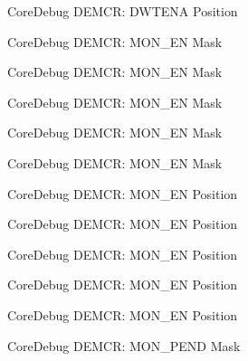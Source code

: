 \begin{DoxyRefList}
\label{deprecated__deprecated000272}%
%
Core\+Debug D\+E\+M\+CR\+: D\+W\+T\+E\+NA Position  
\item[Member \mbox{\hyperlink{group__CMSIS__CoreDebug_gac2b46b9b65bf8d23027f255fc9641977}{Core\+Debug\+\_\+\+D\+E\+M\+C\+R\+\_\+\+M\+O\+N\+\_\+\+E\+N\+\_\+\+Msk}} ]\label{deprecated__deprecated000054}%
%
Core\+Debug D\+E\+M\+CR\+: M\+O\+N\+\_\+\+EN Mask 

\label{deprecated__deprecated000198}%
%
Core\+Debug D\+E\+M\+CR\+: M\+O\+N\+\_\+\+EN Mask 

\label{deprecated__deprecated000340}%
%
Core\+Debug D\+E\+M\+CR\+: M\+O\+N\+\_\+\+EN Mask 

\label{deprecated__deprecated000416}%
%
Core\+Debug D\+E\+M\+CR\+: M\+O\+N\+\_\+\+EN Mask 

\label{deprecated__deprecated000505}%
%
Core\+Debug D\+E\+M\+CR\+: M\+O\+N\+\_\+\+EN Mask  
\item[Member \mbox{\hyperlink{group__CMSIS__CoreDebug_ga802829678f6871863ae9ecf60a10425c}{Core\+Debug\+\_\+\+D\+E\+M\+C\+R\+\_\+\+M\+O\+N\+\_\+\+E\+N\+\_\+\+Pos}} ]\label{deprecated__deprecated000053}%
%
Core\+Debug D\+E\+M\+CR\+: M\+O\+N\+\_\+\+EN Position 

\label{deprecated__deprecated000197}%
%
Core\+Debug D\+E\+M\+CR\+: M\+O\+N\+\_\+\+EN Position 

\label{deprecated__deprecated000339}%
%
Core\+Debug D\+E\+M\+CR\+: M\+O\+N\+\_\+\+EN Position 

\label{deprecated__deprecated000415}%
%
Core\+Debug D\+E\+M\+CR\+: M\+O\+N\+\_\+\+EN Position 

\label{deprecated__deprecated000504}%
%
Core\+Debug D\+E\+M\+CR\+: M\+O\+N\+\_\+\+EN Position  
\item[Member \mbox{\hyperlink{group__CMSIS__CoreDebug_ga68ec55930269fab78e733dcfa32392f8}{Core\+Debug\+\_\+\+D\+E\+M\+C\+R\+\_\+\+M\+O\+N\+\_\+\+P\+E\+N\+D\+\_\+\+Msk}} ]\label{deprecated__deprecated000052}%
%
Core\+Debug D\+E\+M\+CR\+: M\+O\+N\+\_\+\+P\+E\+ND Mask 


\end{DoxyRefList}

